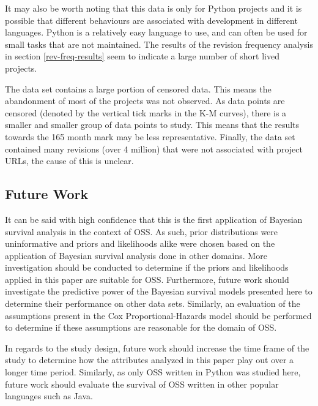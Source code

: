 \documentclass[sigconf,review]{acmart}
\begin{document}
It may also be worth noting that this data is only for Python projects and it is possible that different behaviours are associated with development in different languages.
Python is a relatively easy language to use, and can often be used for small tasks that are not maintained.
The results of the revision frequency analysis in section \ref{rev-freq-results} seem to indicate a large number of short lived projects.

The data set contains a large portion of censored data.
This means the abandonment of most of the projects was not observed.
As data points are censored (denoted by the vertical tick marks in the K-M curves), there is a smaller and smaller group of data points to study.
This means that the results towards the 165 month mark may be less representative. Finally, the data set contained many revisions (over 4 million) that were not associated with project URLs, the cause of this is unclear.

\subsection{Future Work} \label{future}

It can be said with high confidence that this is the first application of Bayesian survival analysis in the context of OSS. 
As such, prior distributions were uninformative and priors and likelihoods alike were chosen based on the application of Bayesian survival analysis done in other domains. 
More investigation should be conducted to determine if the priors and likelihoods applied in this paper are suitable for OSS. 
Furthermore, future work should investigate the predictive power of the Bayesian survival models presented here to determine their performance on other data sets. 
Similarly, an evaluation of the assumptions present in the Cox Proportional-Hazards model should be performed to determine if these assumptions are reasonable for the domain of OSS.

In regards to the study design, future work should increase the time frame of the study to determine how the attributes analyzed in this paper play out over a longer time period. 
Similarly, as only OSS written in Python was studied here, future work should evaluate the survival of OSS written in other popular languages such as Java. 
\end{document}
